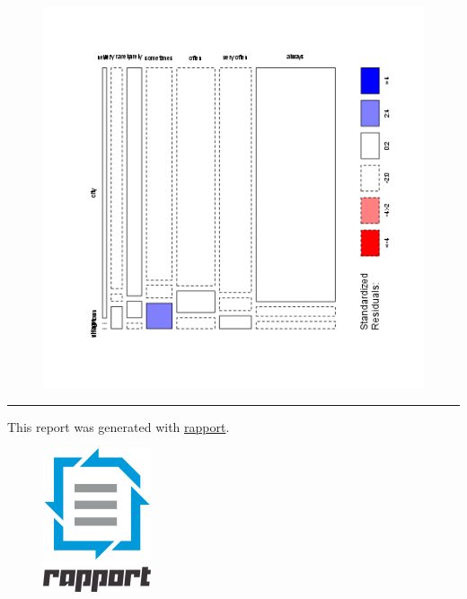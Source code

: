 \documentclass{article}
\makeatletter
\def\maxwidth{\ifdim\Gin@nat@width>\linewidth\linewidth
\else\Gin@nat@width\fi}
\let\Oldincludegraphics\includegraphics
\renewcommand{\includegraphics}[1]{\Oldincludegraphics[width=\maxwidth]{#1}}
\makeatother
\begin{document}
\begin{figure}[htbp]
\centering
\includegraphics{b945f6de1aad4225593b3e9c0eb6d7dc.png}
\caption{}
\end{figure}

\begin{center}\rule{3in}{0.4pt}\end{center}

This report was generated with
\href{http://rapport-package.info/}{rapport}.

\begin{figure}[htbp]
\centering
\includegraphics{images/rapport.png}
\caption{}
\end{figure}
\end{document}
